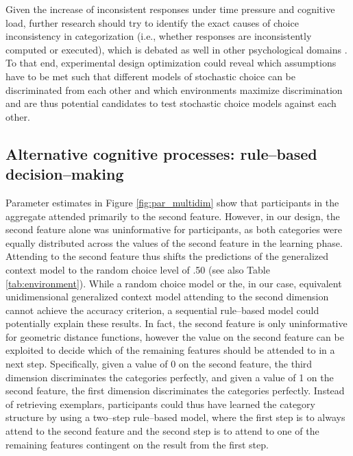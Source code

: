 \documentclass[a4paper,man,natbib]{apa6}
\begin{document}
Given the increase of inconsistent responses under time pressure and cognitive load, further research should try to identify the exact causes of choice inconsistency in categorization (i.e., whether responses are inconsistently computed or executed), which is debated as well in other psychological domains \citep{blavatskyy2010models}. To that end, experimental design optimization \citep{myung2004model} could reveal which assumptions have to be met such that different models of stochastic choice can be discriminated from each other and which environments maximize discrimination and are thus potential candidates to test stochastic choice models against each other.

\subsection{Alternative cognitive processes: rule--based decision--making}
Parameter estimates in Figure \ref{fig:par_multidim} show that participants in the aggregate attended primarily to the second feature. However, in our design, the second feature alone was uninformative for participants, as both categories were equally distributed across the values of the second feature in the learning phase. Attending to the second feature thus shifts the predictions of the generalized context model to the random choice level of .50 (see also Table \ref{tab:environment}). While a random choice model or the, in our case, equivalent unidimensional generalized context model attending to the second dimension cannot achieve the accuracy criterion, a sequential rule--based model could potentially explain these results. In fact, the second feature is only uninformative for geometric distance functions, however the value on the second feature can be exploited to decide which of the remaining features should be attended to in a next step. Specifically, given a value of 0 on the second feature, the third dimension discriminates the categories perfectly, and given a value of 1 on the second feature, the first dimension discriminates the categories perfectly. Instead of retrieving exemplars, participants could thus have learned the category structure by using a two--step rule--based model, where the first step is to always attend to the second feature and the second step is to attend to one of the remaining features contingent on the result from the first step.
\end{document}

